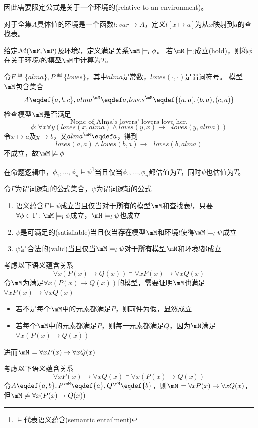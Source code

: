 因此需要限定公式是关于一个环境的(relative to an environment)。
\begin{definition}
对于全集$A$具体值的环境是一个函数$l:var\to A$，定义$l[x\mapsto a]$为从$x$映射到$a$的查找表。
\end{definition}

\begin{definition}
给定$\mathcal{M}(\mF,\mP)$及环境$l$，定义满足关系$\mM\models_l\phi$。
若$\mM\models_l$成立(hold)，则称$\phi$在关于环境$l$的模型$\mM$中计算为$T$。
\end{definition}

\begin{example}
令$F\eqdef\{alma\},P\eqdef\{loves\}$，其中$alma$是常数，$loves(\cdot,\cdot)$是谓词符号。
模型$\mM$包含集合
\[A\eqdef\{a,b,c\},alma^\mM\eqdef a,loves^\mM\eqdef\{(a,a),(b,a),(c,a)\}\]
检查模型$\mM$是否满足
\[\text{None of Alma's lovers' lovers love her.}\]
\[\phi:\forall x\forall y(loves(x,alma)\land loves(y,x)\to\lnot loves(y,alma))\]
令$x\mapsto a$及$y\mapsto b$，又$alma^{\mM}\eqdef a$，得到
\[loves(a,a)\land loves(b,a)\to\lnot loves(b,alma)\]
不成立，故$\mM\not\models\phi$
\end{example}

在命题逻辑中，$\phi_1,\ldots,\phi_n\models\psi$\footnote{$\models$代表语义蕴含(semantic entailment)}当且仅当$\phi_1,\ldots,\phi_n$都估值为$T$，同时$\psi$也估值为$T$。

\begin{definition}
令$\Gamma$为谓词逻辑的公式集合，$\psi$为谓词逻辑的公式
\begin{enumerate}
	\item 语义蕴含$\Gamma\models\psi$成立当且仅当对于\textbf{所有}的模型$\mM$和查找表$l$，只要$\forall \phi\in\Gamma:\mM\models_l\phi$成立，$\mM\models_l\psi$也成立
	\item $\psi$是可满足的(satisfiable)当且仅当\textbf{存在}模型$\mM$和环境$l$使得$\mM\models_l\psi$成立
	\item $\psi$是合法的(valid)当且仅当$\mM\models_l\psi$对于\textbf{所有}模型$\mM$和环境$l$都成立
\end{enumerate}
\end{definition}
\begin{example}
考虑以下语义蕴含关系
\[\forall x(P(x)\to Q(x))\models\forall xP(x)\to\forall xQ(x)\]
令$\mM$为满足$\forall x(P(x)\to Q(x))$的模型，需要证明$\mM$也满足$\forall xP(x)\to\forall xQ(x)$
\begin{itemize}
	\item 若不是每个$\mM$中的元素都满足$P$，则前件为假，显然成立
	\item 若每个$\mM$中的元素都满足$P$，则每一元素都满足$Q$，因为$\mM$满足$\forall x(P(x)\to Q(x))$
\end{itemize}
进而$\mM\models\forall xP(x)\to\forall xQ(x)$
\end{example}
\begin{example}
考虑以下语义蕴含关系
\[\forall xP(x)\to\forall xQ(x)\models\forall x(P(x)\to Q(x))\]
令$A\eqdef\{a,b\},P^\mM\eqdef\{a\},Q^\mM\eqdef\{b\}$，则$\mM\models\forall xP(x)\to\forall xQ(x)$，但$\mM\not\models\forall x(P(x)\to Q(x))$
\end{example}

